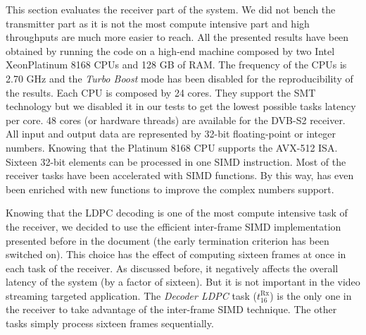 This section evaluates the receiver part of the system. We did not bench
the transmitter part as it is not the most compute intensive part and high
throughputs are much more easier to reach. All the presented results have been
obtained by running the code on a high-end machine composed by two Intel\R
Xeon\TM Platinum 8168 CPUs and 128 GB of RAM. The frequency of the CPUs is 2.70
GHz and the \emph{Turbo Boost} mode has been disabled for the reproducibility of
the results. Each CPU is composed by 24 cores. They support the SMT technology
but we disabled it in our tests to get the lowest possible tasks latency per
core. 48 cores (or hardware threads) are available for the DVB-S2 receiver. All
input and output data are represented by 32-bit floating-point or integer
numbers. Knowing that the Platinum 8168 CPU supports the AVX-512 ISA. Sixteen
32-bit elements can be processed in one SIMD instruction. Most of the receiver
tasks have been accelerated with \MIPP SIMD functions. By this way, \MIPP has
even been enriched with new functions to improve the complex numbers support.

Knowing that the LDPC decoding is one of the most compute intensive task of the
receiver, we decided to use the efficient inter-frame SIMD implementation
presented before in the document (the early termination criterion has been
switched on). This choice has the effect of computing sixteen frames at once in
each task of the receiver. As discussed before, it negatively affects the
overall latency of the system (by a factor of sixteen). But it is not important
in the video streaming targeted application. The \emph{Decoder LDPC} task
($t^\text{Rx}_{16}$) is the only one in the receiver to take advantage of the
inter-frame SIMD technique. The other tasks simply process sixteen frames
sequentially.

